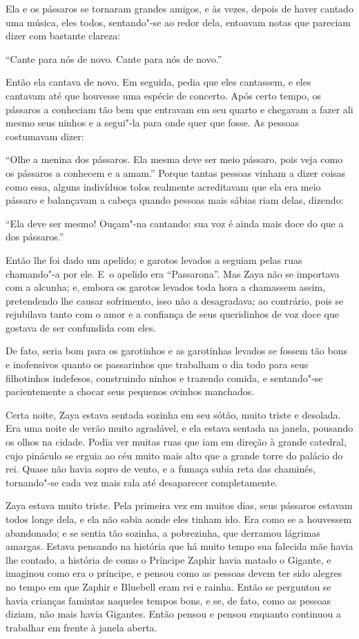 Ela e os pássaros se tornaram grandes amigos, e às vezes, depois de
haver cantado uma música, eles todos, sentando"-se ao redor dela, entoavam
notas que pareciam dizer com bastante clareza:

``Cante para nós de novo. Cante para nós de novo.''

Então ela cantava de novo. Em seguida, pedia que eles cantassem, e eles
cantavam até que houvesse uma espécie de concerto. Após certo tempo, os
pássaros a conheciam tão bem que entravam em seu quarto e chegavam a
fazer ali mesmo seus ninhos e a segui"-la para onde quer que fosse. As
pessoas costumavam dizer:

``Olhe a menina dos pássaros. Ela mesma deve ser meio pássaro, pois
veja como os pássaros a conhecem e a amam.'' Porque tantas pessoas vinham a
dizer coisas como essa, alguns indivíduos tolos realmente acreditavam
que ela era meio pássaro e balançavam a cabeça quando pessoas mais
sábias riam delas, dizendo:

``Ela deve ser mesmo! Ouçam"-na cantando: sua voz é ainda mais doce do
que a dos pássaros.''

Então lhe foi dado um apelido; e garotos levados a seguiam pelas ruas
chamando"-a por ele. E~o apelido era ``Passarona''. Mas Zaya não se
importava com a alcunha; e, embora os garotos levados toda hora a
chamassem assim, pretendendo lhe causar sofrimento, isso não a
desagradava; ao contrário, pois se rejubilava tanto com o amor e a
confiança de seus queridinhos de voz doce que gostava de ser confundida
com eles.

De fato, seria bom para os garotinhos e as garotinhas levados se fossem
tão bons e inofensivos quanto os passarinhos que trabalham o dia todo
para seus filhotinhos indefesos, construindo ninhos e trazendo comida, e
sentando"-se pacientemente a chocar seus pequenos ovinhos manchados.

Certa noite, Zaya estava sentada sozinha em seu sótão, muito triste e
desolada. Era uma noite de verão muito agradável, e ela estava sentada
na janela, pousando os olhos na cidade. Podia ver muitas ruas que
iam em direção à grande catedral, cujo pináculo se erguia ao céu muito
mais alto que a grande torre do palácio do rei. Quase não havia sopro de
vento, e a fumaça subia reta das chaminés, tornando"-se cada vez mais
rala até desaparecer completamente.


Zaya estava muito triste. Pela primeira vez em muitos dias, seus
pássaros estavam todos longe dela, e ela não sabia aonde eles tinham ido.
Era como se a houvessem abandonado; e se sentia tão sozinha,
a pobrezinha, que derramou lágrimas amargas. Estava pensando na história
que há muito tempo sua falecida mãe havia lhe contado, a história de
como o Príncipe Zaphir havia matado o Gigante, e imaginou como era o
príncipe, e pensou como as pessoas devem ter sido alegres no tempo em que Zaphir
e Bluebell eram rei e rainha. Então se perguntou se havia crianças
famintas naqueles tempos bons, e se, de fato, como as pessoas diziam,
não mais havia Gigantes. Então pensou e pensou enquanto continuou a
trabalhar em frente à janela aberta.

